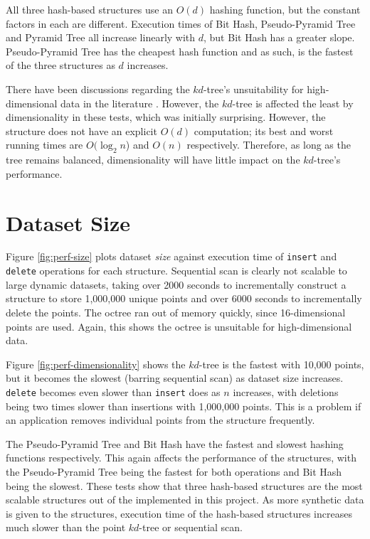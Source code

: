 All three hash-based structures use an $O(d)$ hashing function, but the constant factors in each are different. Execution times of Bit Hash, Pseudo-Pyramid Tree and Pyramid Tree all increase linearly with $d$, but Bit Hash has a greater slope. Pseudo-Pyramid Tree has the cheapest hash function and as such, is the fastest of the three structures as $d$ increases.

There have been discussions regarding the $kd$-tree's unsuitability for high-dimensional data in the literature \cite{highd-nn, search-highd-analysis}. However, the $kd$-tree is affected the least by dimensionality in these tests, which was initially surprising. However, the structure does not have an explicit $O(d)$ computation; its best and worst running times are $O(\log_2 n$) and $O(n)$ respectively. Therefore, as long as the tree remains balanced, dimensionality will have little impact on the $kd$-tree's performance.

\section{Dataset Size}

Figure \ref{fig:perf-size} plots dataset \textit{size} against execution time of \texttt{insert} and \texttt{delete} operations for each structure. Sequential scan is clearly not scalable to large dynamic datasets, taking over 2000 seconds to incrementally construct a structure to store 1,000,000 unique points and over 6000 seconds to incrementally delete the points. The octree ran out of memory quickly, since 16-dimensional points are used. Again, this shows the octree is unsuitable for high-dimensional data.

Figure \ref{fig:perf-dimensionality} shows the $kd$-tree is the fastest with 10,000 points, but it becomes the slowest (barring sequential scan) as dataset size increases. \texttt{delete} becomes even slower than \texttt{insert} does as $n$ increases, with deletions being two times slower than insertions with 1,000,000 points. This is a problem if an application removes individual points from the structure frequently.

The Pseudo-Pyramid Tree and Bit Hash have the fastest and slowest hashing functions respectively. This again affects the performance of the structures, with the Pseudo-Pyramid Tree being the fastest for both operations and Bit Hash being the slowest. These tests show that three hash-based structures are the most scalable structures out of the implemented in this project. As more synthetic data is given to the structures, execution time of the hash-based structures increases much slower than the point $kd$-tree or sequential scan.

